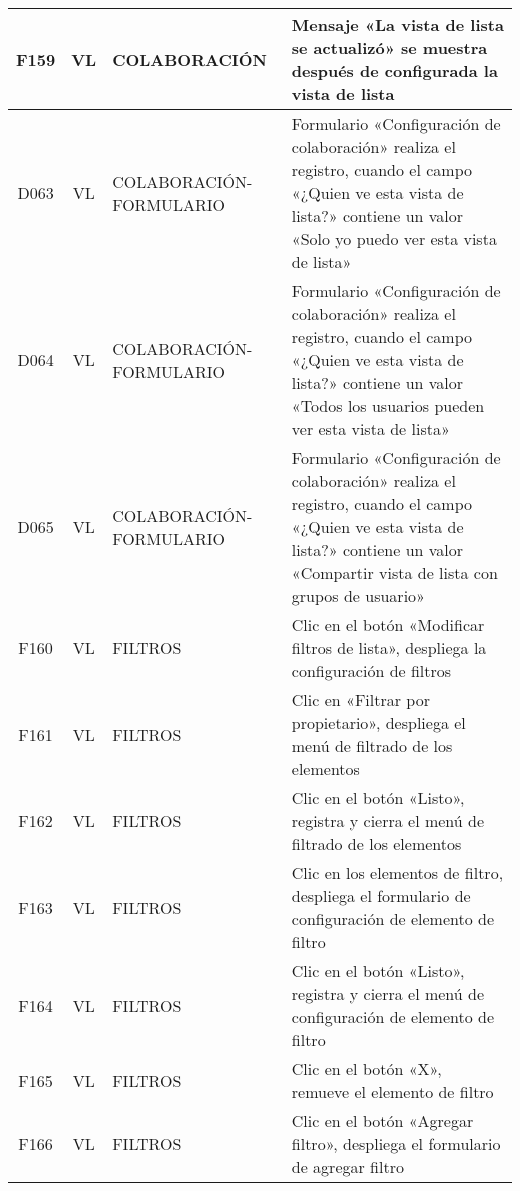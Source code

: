 \begin{landscape}
{\begin{longtable}[htb]{|c|c|p{3.8cm}|p{15.2cm}|}
\scriptsize{F159} & \scriptsize{VL} & \scriptsize{COLABORACIÓN} & \scriptsize{Mensaje «La vista de lista se actualizó» se muestra después de configurada la vista de lista} \\ \hline
\scriptsize{D063} & \scriptsize{VL} & \scriptsize{COLABORACIÓN-FORMULARIO} & \scriptsize{Formulario «Configuración de colaboración» realiza el registro, cuando el campo «¿Quien ve esta vista de lista?» contiene un valor «Solo yo puedo ver esta vista de lista»} \\ \hline
\scriptsize{D064} & \scriptsize{VL} & \scriptsize{COLABORACIÓN-FORMULARIO} & \scriptsize{Formulario «Configuración de colaboración» realiza el registro, cuando el campo «¿Quien ve esta vista de lista?» contiene un valor «Todos los usuarios pueden ver esta vista de lista»} \\ \hline
\scriptsize{D065} & \scriptsize{VL} & \scriptsize{COLABORACIÓN-FORMULARIO} & \scriptsize{Formulario «Configuración de colaboración» realiza el registro, cuando el campo «¿Quien ve esta vista de lista?» contiene un valor «Compartir vista de lista con grupos de usuario»} \\ \hline
\scriptsize{F160} & \scriptsize{VL} & \scriptsize{FILTROS} & \scriptsize{Clic en el botón «Modificar filtros de lista», despliega la configuración de filtros} \\ \hline
\scriptsize{F161} & \scriptsize{VL} & \scriptsize{FILTROS} & \scriptsize{Clic en «Filtrar por propietario», despliega el menú de filtrado de los elementos} \\ \hline
\scriptsize{F162} & \scriptsize{VL} & \scriptsize{FILTROS} & \scriptsize{Clic en el botón «Listo», registra y cierra el menú de filtrado de los elementos} \\ \hline
\scriptsize{F163} & \scriptsize{VL} & \scriptsize{FILTROS} & \scriptsize{Clic en los elementos de filtro, despliega el formulario de configuración de elemento de filtro} \\ \hline
\scriptsize{F164} & \scriptsize{VL} & \scriptsize{FILTROS} & \scriptsize{Clic en el botón «Listo», registra y cierra el menú de configuración de elemento de filtro} \\ \hline
\scriptsize{F165} & \scriptsize{VL} & \scriptsize{FILTROS} & \scriptsize{Clic en el botón «X», remueve el elemento de filtro} \\ \hline
\scriptsize{F166} & \scriptsize{VL} & \scriptsize{FILTROS} & \scriptsize{Clic en el botón «Agregar filtro», despliega el formulario de agregar filtro} \\ \hline

\end{longtable}}
\end{landscape}

